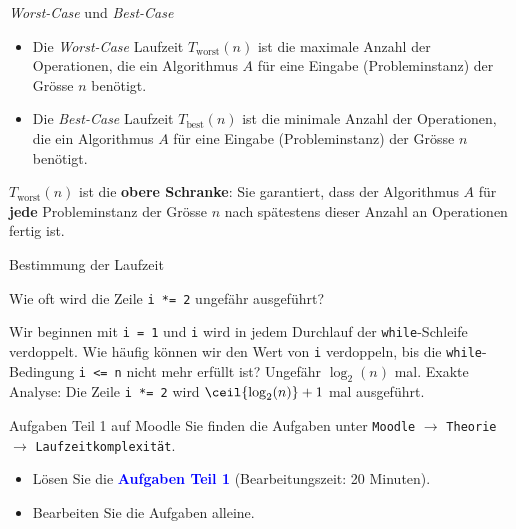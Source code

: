 \begin{frame}{\emph{Worst-Case} und \emph{Best-Case}}
	\begin{itemize}[<+->]
		\item Die \emph{Worst-Case} Laufzeit $T_{\text{worst}}(n)$ ist die maximale Anzahl der Operationen, die ein Algorithmus $A$ für eine Eingabe (Probleminstanz) der Grösse $n$ benötigt.
		\item Die \emph{Best-Case} Laufzeit $T_{\text{best}}(n)$ ist die minimale Anzahl der Operationen, die ein Algorithmus $A$ für eine Eingabe (Probleminstanz) der Grösse $n$ benötigt.
	\end{itemize}
\end{frame}

\begin{frame}
\begin{myremark}
	$T_{\text{worst}}(n)$ ist die \textbf{obere Schranke}: Sie garantiert, dass der Algorithmus $A$ für \textbf{jede} Probleminstanz der Grösse $n$ nach spätestens dieser Anzahl an Operationen fertig ist.
\end{myremark}
\end{frame}

\begin{frame}{Bestimmung der Laufzeit \faStar\faStar\faStar[regular]\faStar[regular]\faStar[regular]}
	\begin{myexercise}
	

	Wie oft wird die Zeile \lstinline{i *= 2} ungefähr ausgeführt?
	\end{myexercise}
\end{frame}

\begin{frame}
	\begin{myanswer}
	Wir beginnen mit \lstinline{i = 1} und \lstinline{i} wird in jedem Durchlauf der \lstinline{while}-Schleife verdoppelt. Wie häufig können wir den Wert von \lstinline{i} verdoppeln, bis die \lstinline{while}-Bedingung \lstinline{i <= n} nicht mehr erfüllt ist? Ungefähr $\log_2(n)$ mal.
	\pause
	\vspace{1cm}
	{\small
	Exakte Analyse: Die Zeile \lstinline{i *= 2} wird $\ceil{\log_2(n)} + 1$ mal ausgeführt.
	}
	\end{myanswer}
\end{frame}

\begin{frame}{Aufgaben Teil 1 auf Moodle}
	Sie finden die Aufgaben unter \texttt{Moodle} $\rightarrow$ \texttt{Theorie} $\rightarrow$ \texttt{Laufzeitkomplexität}.
	\pause
	\begin{itemize}[<+->]
		\item Lösen Sie die \textcolor{Blue}{\textbf{Aufgaben Teil 1}} (Bearbeitungszeit: 20 Minuten).
		\item Bearbeiten Sie die Aufgaben alleine.
	\end{itemize}
\end{frame}

